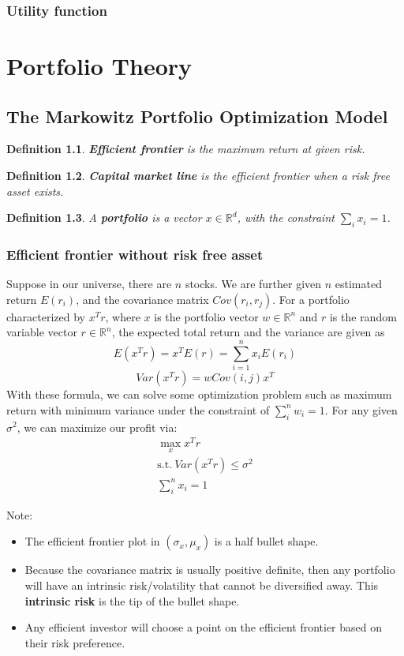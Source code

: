 \documentclass[a4paper,13pt]{report}
\newcommand{\R}{\mathbb{R}}
\newtheorem*{definition}{Definition}
\begin{document}
\subsection{Utility function}
\chapter{Portfolio Theory}
\section{The Markowitz Portfolio Optimization Model}
\begin{definition}
\textbf{Efficient frontier} is the maximum return at given risk. 
\end{definition}

\begin{definition}
\textbf{Capital market line} is the efficient frontier when a risk free asset exists. 
\end{definition}

\begin{definition}
A \textbf{portfolio} is a vector $x\in \R^d$, with the constraint $\sum_i x_i = 1$. 
\end{definition}



\subsection{Efficient frontier without risk free asset}
Suppose in our universe, there are $n$ stocks. We are further given $n$ estimated return $E(r_i)$, and the covariance matrix $Cov(r_i,r_j)$. For a portfolio characterized by $x^T r$, where $x$ is the portfolio vector $w\in \mathbb{R}^n$ and $r$ is the random variable vector $r\in \mathbb{R}^n$, the expected total return and the variance are given as
$$E(x^Tr)=x^TE(r)=\sum_{i=1}^n x_iE(r_i)$$
$$Var(x^Tr) = w Cov(i,j) x^T$$
With these formula, we can solve some optimization problem such as maximum return with minimum variance under the constraint of $\sum_i^nw_i=1$. For any given $\sigma^2$, we can maximize our profit via:
\begin{align*}
    \max_{x} x^T r \\
    \text{s.t.} ~ Var(x^T r) \leq \sigma^2 \\
    \sum_i^n x_i=1
\end{align*}

Note:
\begin{itemize}
    \item The efficient frontier plot in $(\sigma_x,\mu_x)$ is a half bullet shape. 
    \item Because the covariance matrix is usually positive definite, then any portfolio will have an intrinsic risk/volatility that cannot be diversified away. This \textbf{intrinsic risk} is the tip of the bullet shape. 
    \item Any efficient investor will choose a point on the efficient frontier based on their risk preference. 
\end{itemize}
\end{document}
